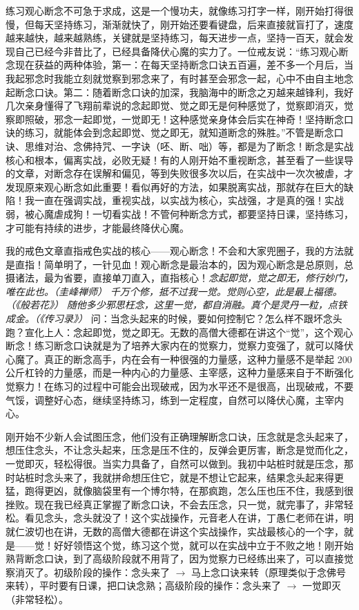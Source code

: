 练习观心断念不可急于求成，这是一个慢功夫，就像练习打字一样，刚开始打得很慢，但每天坚持练习，渐渐就快了，刚开始还要看键盘，后来直接就盲打了，速度越来越快，越来越熟练，关键就是坚持练习，每天进步一点，坚持一百天，就会发现自己已经今非昔比了，已经具备降伏心魔的实力了。一位戒友说：“练习观心断念现在获益的两种体验，第一：在每天坚持断念口诀五百遍，差不多一个月后，当我起邪念时我能立刻就觉察到邪念来了，有时甚至会邪念一起，心中不由自主地念起断念口诀。第二：随着断念口诀的加深，我脑海中的断念之刃越来越锋利，我好几次亲身懂得了飞翔前辈说的念起即觉、觉之即无是何种感觉了，觉察即消灭，觉察即照破，邪念一起即觉，一觉即无！这种感觉亲身体会后实在神奇！坚持断念口诀的练习，就能体会到念起即觉、觉之即无，就知道断念的殊胜。”不管是断念口诀、思维对治、念佛持咒、一字诀（呸、断、咄）等，都是为了断念！断念是实战核心和根本，偏离实战，必败无疑！有的人刚开始不重视断念，甚至看了一些误导的文章，对断念存在误解和偏见，等到失败很多次以后，在实战中一次次被虐，才发现原来观心断念如此重要！看似再好的方法，如果脱离实战，那就存在巨大的缺陷！我一直在强调实战，重视实战，以实战为核心，实战强，才是真的强！实战弱，被心魔虐成狗！一切看实战！不管何种断念方式，都要坚持日课，坚持练习，才可能有持续的进步，才能最终降伏心魔。

我的戒色文章直指戒色实战的核心——观心断念！不会和大家兜圈子，我的方法就是直指！简单明了，一针见血！观心断念是最治本的，因为观心断念是总原则，总摄诸法，最为省要，直接单刀直入，直指核心！\textit{念起即觉，觉之即无，修行妙门，唯在此也。（圭峰禅师）} \textit{千万个修，抵不过我一觉。觉则心空，此是最上福德。（《般若花》）} \textit{随他多少邪思枉念，这里一觉，都自消融。真个是灵丹一粒，点铁成金。（《传习录》）} 问：当念头起来的时候，要如何控制它？怎么样不跟坏念头跑？宣化上人：念起即觉，觉之即无。无数的高僧大德都在讲这个“觉”，这个观心断念！练习断念口诀就是为了培养大家内在的觉察力，觉察力变强了，就可以降伏心魔了。真正的断念高手，内在会有一种很强的力量感，这种力量感不是举起 200 公斤杠铃的力量感，而是一种内心的力量感、主宰感，这种力量感来自于不断强化觉察力！在练习的过程中可能会出现破戒，因为水平还不是很高，出现破戒，不要气馁，调整好心态，继续坚持练习，练到一定程度，自然可以降伏心魔，主宰内心。

刚开始不少新人会试图压念，他们没有正确理解断念口诀，压念就是念头起来了，想压住念头，不让念头起来，压念是压不住的，反弹会更厉害，断念是觉而化之，一觉即灭，轻松得很。当实力具备了，自然可以做到。我初中站桩时就是压念，那时站桩时念头来了，我就拼命想压住它，就是不想让它起来，结果念头起来得更猛，跑得更凶，就像脑袋里有一个博尔特，在那疯跑，怎么压也压不住，我感到很挫败。现在我已经真正掌握了断念口诀，不会去压念，只一觉，就完事了，非常轻松。看见念头，念头就没了！这个实战操作，元音老人在讲，丁愚仁老师在讲，明就仁波切也在讲，无数的高僧大德都在讲这个实战操作，实战最核心的一个字，就是——觉！好好领悟这个觉，练习这个觉，就可以在实战中立于不败之地！刚开始熟背断念口诀，到了高级阶段就不用背了，因为觉察力已经练出来了，可以直接觉察消灭了。初级阶段的操作：念头来了 $\to$ 马上念口诀来转（原理类似于念佛号来转），平时要有日课，把口诀念熟；高级阶段的操作：念头来了 $\to$ 一觉即灭（非常轻松）。

